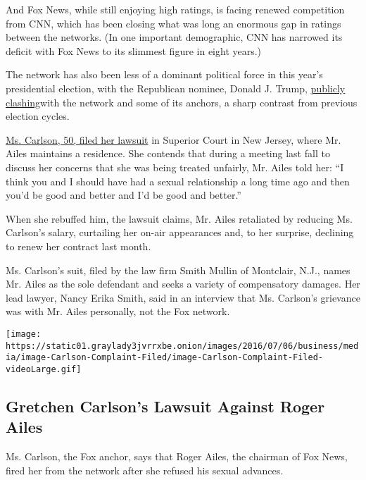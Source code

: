 And Fox News, while still enjoying high ratings, is facing renewed
competition from CNN, which has been closing what was long an enormous
gap in ratings between the networks. (In one important demographic, CNN
has narrowed its deficit with Fox News to its slimmest figure in eight
years.)

The network has also been less of a dominant political force in this
year's presidential election, with the Republican nominee, Donald J.
Trump,
\href{http://www.nytimes3xbfgragh.onion/2016/01/28/us/politics/with-no-detente-donald-trumps-feud-with-fox-takes-center-stage.html}{publicly
clashing}with the network and some of its anchors, a sharp contrast from
previous election cycles.

\href{https://www.documentcloud.org/documents/2941030-Carlson-Complaint-Filed.html}{Ms.
Carlson, 50, filed her lawsuit} in Superior Court in New Jersey, where
Mr. Ailes maintains a residence. She contends that during a meeting last
fall to discuss her concerns that she was being treated unfairly, Mr.
Ailes told her: ``I think you and I should have had a sexual
relationship a long time ago and then you'd be good and better and I'd
be good and better.''

When she rebuffed him, the lawsuit claims, Mr. Ailes retaliated by
reducing Ms. Carlson's salary, curtailing her on-air appearances and, to
her surprise, declining to renew her contract last month.

Ms. Carlson's suit, filed by the law firm Smith Mullin of Montclair,
N.J., names Mr. Ailes as the sole defendant and seeks a variety of
compensatory damages. Her lead lawyer, Nancy Erika Smith, said in an
interview that Ms. Carlson's grievance was with Mr. Ailes personally,
not the Fox network.

\href{https://www.nytimes3xbfgragh.onion/interactive/2016/07/06/business/media/document-Carlson-Complaint-Filed.html}{}

\texttt{[image: https://static01.graylady3jvrrxbe.onion/images/2016/07/06/business/media/image-Carlson-Complaint-Filed/image-Carlson-Complaint-Filed-videoLarge.gif]}

\hypertarget{gretchen-carlsons-lawsuit-against-roger-ailes}{%
\subsection{Gretchen Carlson's Lawsuit Against Roger
Ailes}\label{gretchen-carlsons-lawsuit-against-roger-ailes}}

Ms. Carlson, the Fox anchor, says that Roger Ailes, the chairman of Fox
News, fired her from the network after she refused his sexual advances.

